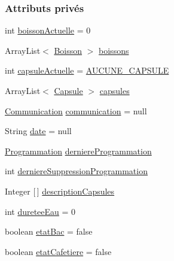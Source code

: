 \subsubsection*{Attributs privés}
\begin{DoxyCompactItemize}
\item 
int \hyperlink{classcom_1_1example_1_1ekawa_1_1_cafetiere_a73c5fa3b510655e1e3425140336b7f5b}{boisson\+Actuelle} = 0
\item 
Array\+List$<$ \hyperlink{classcom_1_1example_1_1ekawa_1_1_boisson}{Boisson} $>$ \hyperlink{classcom_1_1example_1_1ekawa_1_1_cafetiere_aad375efbc01f1db83572f4ae567189de}{boissons}
\item 
int \hyperlink{classcom_1_1example_1_1ekawa_1_1_cafetiere_ac8fa3d1ad76eccf431ee04b395a557a3}{capsule\+Actuelle} = \hyperlink{classcom_1_1example_1_1ekawa_1_1_cafetiere_a5a23a636fa5f2e5826458e700f453c16}{A\+U\+C\+U\+N\+E\+\_\+\+C\+A\+P\+S\+U\+LE}
\item 
Array\+List$<$ \hyperlink{classcom_1_1example_1_1ekawa_1_1_capsule}{Capsule} $>$ \hyperlink{classcom_1_1example_1_1ekawa_1_1_cafetiere_ae9590789503a6ae2094c86cf93299821}{capsules}
\item 
\hyperlink{classcom_1_1example_1_1ekawa_1_1_communication}{Communication} \hyperlink{classcom_1_1example_1_1ekawa_1_1_cafetiere_af9506a7805d000d2cb83444cdb8ea889}{communication} = null
\item 
String \hyperlink{classcom_1_1example_1_1ekawa_1_1_cafetiere_a61e4ab1e5ebdc60ffea39a344711e477}{date} = null
\item 
\hyperlink{classcom_1_1example_1_1ekawa_1_1_programmation}{Programmation} \hyperlink{classcom_1_1example_1_1ekawa_1_1_cafetiere_ae5fa359f1ddcbd80ce3651e2d7368ff8}{derniere\+Programmation}
\item 
int \hyperlink{classcom_1_1example_1_1ekawa_1_1_cafetiere_a79faede6506425563ec617affef48e09}{derniere\+Suppression\+Programmation}
\item 
Integer \mbox{[}$\,$\mbox{]} \hyperlink{classcom_1_1example_1_1ekawa_1_1_cafetiere_a054b6a7668e317cfa1da3d8600311e4e}{description\+Capsules}
\item 
int \hyperlink{classcom_1_1example_1_1ekawa_1_1_cafetiere_aafc365a43172fca9166fb2a9006c6ecf}{duretee\+Eau} = 0
\item 
boolean \hyperlink{classcom_1_1example_1_1ekawa_1_1_cafetiere_a058f7a18cd9c0567d583b8bc6250d143}{etat\+Bac} = false
\item 
boolean \hyperlink{classcom_1_1example_1_1ekawa_1_1_cafetiere_ae170dd018d1e740b3bda080d1cc3d900}{etat\+Cafetiere} = false

\end{DoxyCompactItemize}
